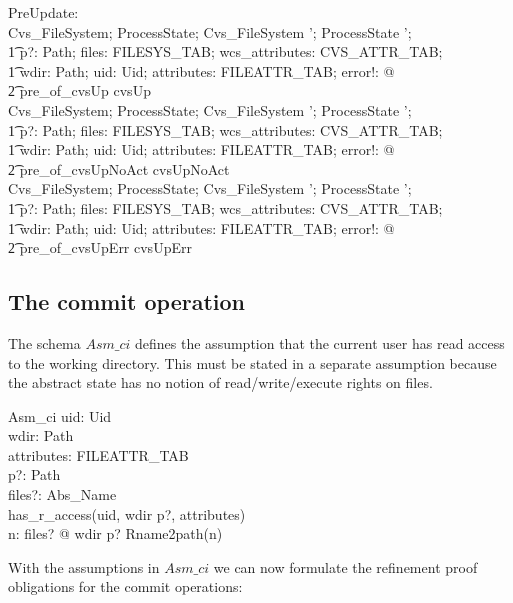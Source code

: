 \begin{axdef}
  PreUpdate: \nat \\
  \where
  \forall Cvs\_FileSystem; ProcessState; Cvs\_FileSystem '; ProcessState '; \\
  \t1 p?: Path; files: FILESYS\_TAB; wcs\_attributes: CVS\_ATTR\_TAB; \\
  \t1 wdir: Path; uid: Uid; attributes: FILEATTR\_TAB; error!: \denotation @ \\
  \t2 pre\_of\_cvsUp \implies \pre cvsUp \\

  \forall Cvs\_FileSystem; ProcessState; Cvs\_FileSystem '; ProcessState '; \\
  \t1 p?: Path; files: FILESYS\_TAB; wcs\_attributes: CVS\_ATTR\_TAB; \\
  \t1 wdir: Path; uid: Uid; attributes: FILEATTR\_TAB; error!: \denotation @ \\
  \t2 pre\_of\_cvsUpNoAct \implies \pre cvsUpNoAct \\

  \forall Cvs\_FileSystem; ProcessState; Cvs\_FileSystem '; ProcessState '; \\
  \t1 p?: Path; files: FILESYS\_TAB; wcs\_attributes: CVS\_ATTR\_TAB; \\
  \t1 wdir: Path; uid: Uid; attributes: FILEATTR\_TAB; error!: \denotation @ \\
  \t2 pre\_of\_cvsUpErr \implies \pre cvsUpErr \\
\end{axdef}


\subsection{The commit operation}

The schema $Asm\_ci$ defines the assumption that the current user has read
access to the working directory.  This must be stated in a separate assumption
because the abstract state has no notion of read/write/execute rights on files.
\begin{schema}{Asm\_ci}
  uid: Uid \\
  wdir: Path \\
  attributes: FILEATTR\_TAB \\
  p?: Path \\
  files?: \power Abs\_Name \\
  \where
  has\_r\_access(uid, wdir \cat p?, attributes) \\
  \forall n: files? @ wdir \cat p? \prefix Rname2path(n) \\
\end{schema}
\noindent With the assumptions in $Asm\_ci$ we can now formulate the refinement
proof obligations for the commit operations:

